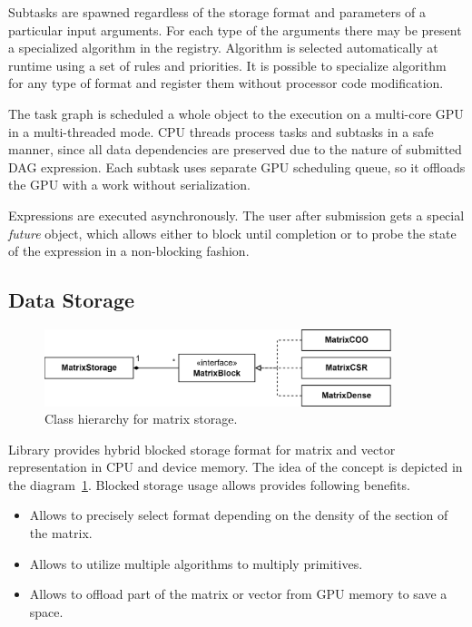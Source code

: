 Subtasks are spawned regardless of the storage format and parameters of a particular input arguments. For each type of the arguments there may be present a specialized algorithm in the registry. Algorithm is selected automatically at runtime using a set of rules and priorities. It is possible to specialize algorithm for any type of format and register them without processor code modification. 

The task graph is scheduled a whole object to the execution on a multi-core GPU in a multi-threaded mode. CPU threads process tasks and subtasks in a safe manner, since all data dependencies are preserved due to the nature of submitted DAG expression. Each subtask uses separate GPU scheduling queue, so it offloads the GPU with a work without serialization.

Expressions are executed asynchronously. The user after submission gets a special \textit{future} object, which allows either to block until completion or to probe the state of the expression in a non-blocking fashion.

\subsection{Data Storage}

\begin{figure}
    \centering
    \includegraphics[width=0.9\textwidth]{images/matrix_storage_hie.png}
    \caption{Class hierarchy for matrix storage.}
    \label{fig:matrix_storage_hie}
\end{figure}

Library provides hybrid blocked storage format for matrix and vector representation in CPU and device memory. The idea of the concept is depicted in the diagram~\ref{fig:matrix_storage_hie}. Blocked storage usage allows provides following benefits.

\begin{itemize}
    \item Allows to precisely select format depending on the density of the section of the matrix.
    \item Allows to utilize multiple algorithms to multiply primitives.
    \item Allows to offload part of the matrix or vector from GPU memory to save a space.
\end{itemize}

